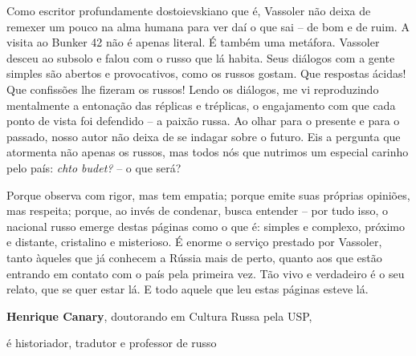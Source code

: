 Como escritor profundamente dostoievskiano que é, Vassoler não deixa de
remexer um pouco na alma humana para ver daí o que sai -- de bom e de
ruim. A visita ao Bunker 42 não é apenas literal. É também uma metáfora.
Vassoler desceu ao subsolo e falou com o russo que lá habita. Seus
diálogos com a gente simples são abertos e provocativos, como os russos
gostam. Que respostas ácidas! Que confissões lhe fizeram os russos!
Lendo os diálogos, me vi reproduzindo mentalmente a entonação das
réplicas e tréplicas, o engajamento com que cada ponto de vista foi
defendido -- a paixão russa. Ao olhar para o presente e para o passado,
nosso autor não deixa de se indagar sobre o futuro. Eis a pergunta que
atormenta não apenas os russos, mas todos nós que nutrimos um especial
carinho pelo país: \emph{chto budet?} -- o que será?

Porque observa com rigor, mas tem empatia; porque emite suas próprias
opiniões, mas respeita; porque, ao invés de condenar, busca entender --
por tudo isso, o nacional russo emerge destas páginas como o que é:
simples e complexo, próximo e distante, cristalino e misterioso. É
enorme o serviço prestado por Vassoler, tanto àqueles que já conhecem a
Rússia mais de perto, quanto aos que estão entrando em contato com o
país pela primeira vez. Tão vivo e verdadeiro é o seu relato, que se
quer estar lá. E todo aquele que leu estas páginas esteve lá.

\textbf{Henrique Canary}, doutorando em Cultura Russa pela USP,

é historiador, tradutor e professor de russo
